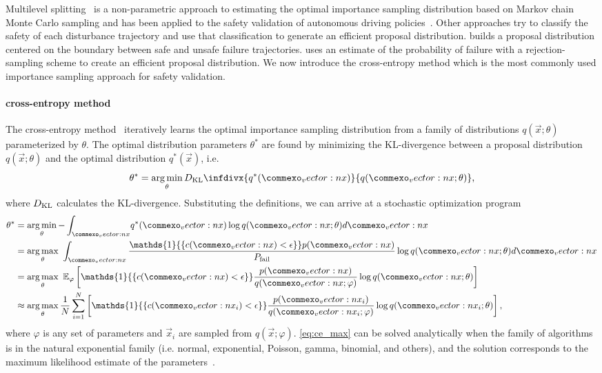 Multilevel splitting~\cite{kahn1951estimation} is a non-parametric approach to estimating the optimal importance sampling distribution based on Markov chain Monte Carlo sampling and has been applied to the safety validation of autonomous driving policies~\cite{norden2019efficient}. Other approaches try to classify the safety of each disturbance trajectory and use that classification to generate an efficient proposal distribution. \textcite{huang2018versatile} builds a proposal distribution centered on the boundary between safe and unsafe failure trajectories. \textcite{uesato2019rigorous} uses an estimate of the probability of failure with a rejection-sampling scheme to create an efficient proposal distribution. We now introduce the cross-entropy method which is the most commonly used importance sampling approach for safety validation. 

\paragraph{cross-entropy method}
The cross-entropy method~\cite{rubinstein2013cross,de2005tutorial} iteratively learns the optimal importance sampling distribution from a family of distributions $q(\vec{x}; \theta)$ parameterized by $\theta$. The optimal distribution parameters $\theta^*$ are found by minimizing the KL-divergence between a proposal distribution $q(\vec{x}; \theta)$ and the optimal distribution $q^*(\vec{x})$, i.e.
\begin{equation}
    \theta^* = \argmin\limits_\theta D_{\rm KL}\infdivx{q^*(\vec{x})}{ q(\vec{x}; \theta)} \text{,}
\end{equation}
where $D_{\rm KL}$ calculates the KL-divergence. Substituting the definitions, we can arrive at a stochastic optimization program
\begin{align}
    \theta^* &= \argmin\limits_\theta {- \int_{\vec{x}}} q^*(\vec{x}) \log q(\vec{x}; \theta) d\vec{x} \\
    &= \argmax\limits_\theta \  \int_{\vec{x}} \frac{\mathds{1}{\{ c(\vec{x}) < \epsilon \}}p(\vec{x})}{P_{\rm fail}} \log q(\vec{x}; \theta) d\vec{x} \\
     &= \argmax\limits_\theta \ \mathbb{E}_{\varphi} \left[ \mathds{1}{\{ c(\vec{x}) < \epsilon \}} \frac{p(\vec{x})}{q(\vec{x}; \varphi)}\log q(\vec{x}; \theta) \right]  \\
     &\approx \argmax\limits_\theta \frac{1}{N} \sum_{i=1}^N \left[ \mathds{1}{\{ c(\vec{x}_i) < \epsilon \}} \frac{p(\vec{x}_i)}{q(\vec{x}_i; \varphi)}\log q(\vec{x}_i; \theta) \right] \label{eq:ce_max} \text{,}
\end{align}
where $\varphi$ is any set of parameters and $\vec{x}_i$ are sampled from $q(\vec{x}; \varphi)$. \cref{eq:ce_max} can be solved analytically when the family of algorithms is in the natural exponential family (i.e. normal, exponential, Poisson, gamma, binomial, and others), and the solution corresponds to the maximum likelihood estimate of the parameters~\cite{de2005tutorial}.

